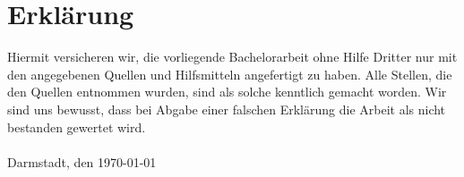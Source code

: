 \section*{Erklärung}

Hiermit versicheren wir, die vorliegende Bachelorarbeit ohne Hilfe Dritter nur mit den angegebenen Quellen und Hilfsmitteln angefertigt zu haben. Alle Stellen, die den Quellen entnommen wurden, sind als solche kenntlich gemacht worden. Wir sind uns bewusst, dass bei Abgabe einer falschen Erklärung die Arbeit als nicht bestanden gewertet wird. \\ \\

Darmstadt, den \today

%
%
%



